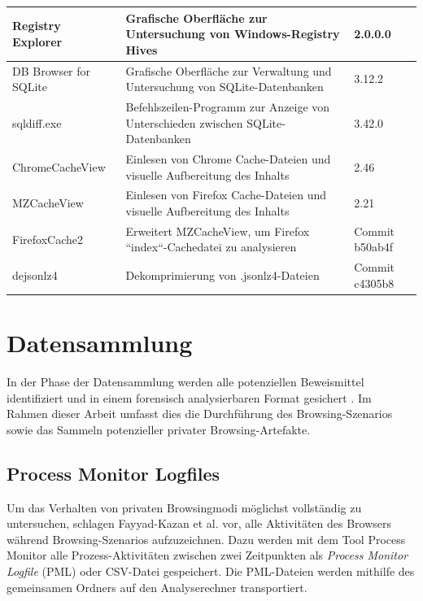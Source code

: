 \begin{table}[h!]
{\begin{tabular}{|l|l|l|}
Registry Explorer                       & Grafische Oberfläche zur Untersuchung von Windows-Registry Hives                & 2.0.0.0                               \\ \hline
DB Browser for SQLite                   & Grafische Oberfläche zur Verwaltung und Untersuchung von SQLite-Datenbanken      & 3.12.2                                \\ \hline
sqldiff.exe                             & Befehlszeilen-Programm zur Anzeige von Unterschieden zwischen SQLite-Datenbanken & 3.42.0                                \\ \hline
ChromeCacheView                         & Einlesen von Chrome Cache-Dateien und visuelle Aufbereitung des Inhalts          & 2.46                                  \\ \hline
MZCacheView                             & Einlesen von Firefox Cache-Dateien und visuelle Aufbereitung des Inhalts         & 2.21                                  \\ \hline
FirefoxCache2                           & Erweitert MZCacheView, um Firefox ``index``-Cachedatei zu analysieren              & Commit b50ab4f                        \\ \hline
dejsonlz4                               & Dekomprimierung von .jsonlz4-Dateien                                             & Commit c4305b8                        \\ \hline
\end{tabular}
}
\end{table}


\section{Datensammlung}
\label{section:methodik-datensammlung}
In der Phase der Datensammlung werden alle potenziellen Beweismittel identifiziert und in einem forensisch analysierbaren Format gesichert \cite{Izzati.2022}.
Im Rahmen dieser Arbeit umfasst dies die Durchführung des Browsing-Szenarios sowie das Sammeln potenzieller privater Browsing-Artefakte.

\subsection*{Process Monitor Logfiles}
\label{subsection:methodik-datensammlung-processmonitorlogfiles}
Um das Verhalten von privaten Browsingmodi möglichst vollständig zu untersuchen, schlagen Fayyad-Kazan et al. \cite{Fayyad.2021} vor, alle Aktivitäten des Browsers während Browsing-Szenarios aufzuzeichnen.
Dazu werden mit dem Tool Process Monitor alle Prozess-Aktivitäten zwischen zwei Zeitpunkten als \textit{Process Monitor Logfile} (PML) oder CSV-Datei gespeichert. \cite{Fayyad.2021, Rochmadi.2017}
Die PML-Dateien werden mithilfe des gemeinsamen Ordners auf den Analyserechner transportiert.

